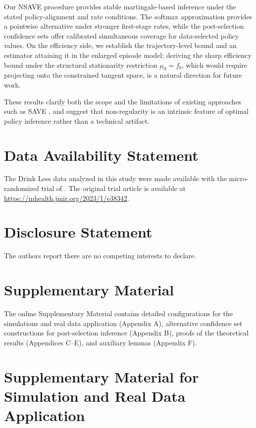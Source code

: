 \documentclass[12pt]{article}
\theoremstyle{remark}\newtheorem{remark}[theorem]{Remark}\theoremstyle{plain}
\begin{document}
Our NSAVE procedure provides stable martingale-based inference under
the stated policy-alignment and rate conditions.  The softmax
approximation provides a pointwise alternative under stronger
first-stage rates, while the post-selection confidence sets offer
calibrated simultaneous coverage for data-selected policy values.
On the efficiency side, we establish the trajectory-level bound and an
estimator attaining it in the enlarged episode model; deriving the
sharp efficiency bound under the structural stationarity restriction
$\mu_0=f_b$, which would require projecting onto the constrained
tangent space, is a natural direction for future work.

These results clarify both the scope and the limitations of existing approaches such as SAVE \citep{shi2022statistical}, and suggest that non-regularity is an intrinsic feature of optimal policy inference rather than a technical artifact.

\section*{Data Availability Statement}

The Drink Less data analyzed in this study were made available with the micro-randomized trial of \citet{bell2023notifications}.  The original trial article is available at \url{https://mhealth.jmir.org/2023/1/e38342}.

\section*{Disclosure Statement}

The authors report there are no competing interests to declare.

\section*{Supplementary Material}

The online Supplementary Material contains detailed configurations for the simulations and real data application (Appendix A), alternative confidence set constructions for post-selection inference (Appendix B), proofs of the theoretical results (Appendices C--E), and auxiliary lemmas (Appendix F).




\newpage 

\appendix


\section{Supplementary Material for Simulation and Real Data Application}
\end{document}
